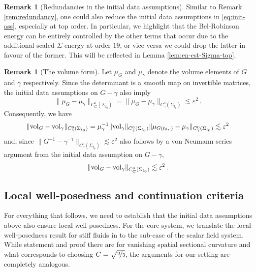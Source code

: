 \documentclass[11pt,leqno,textwidth=10cm]{amsart}
\numberwithin{equation}{section}
\theoremstyle{definition}
\newtheorem{remark}[definition]{Remark}
\theoremstyle{plain}
\newcommand{\1}{\mathbbm{1}}
\newcommand{\vol}[1]{{\text{\normalfont{vol}}}_{#1}}
\renewcommand{\epsilon}{\varepsilon}
\newcommand{\change}[1]{\color{black}#1\color{black}}
\begin{document}
\begin{remark}[Redundancies in the initial data assumptions]
Similar to Remark \ref{rem:redundancy}, one could also reduce the \change{initial data }assumptions in \eqref{eq:init-ass}\change{, especially at top order}. In particular, we highlight that the Bel-Robinson energy can be entirely controlled by the other terms that occur due to the additional scaled $\Sigma$-energy at order \change{$19$}, or vice versa we could drop the latter in favour of the former. This will be reflected in Lemma \ref{lem:en-est-Sigma-top}.
\end{remark}

\begin{remark}[The volume form]\label{eq:rem-vol-form}
Let $\mu_G$ and $\mu_\gamma$ denote the volume elements of $G$ and $\gamma$ respectively. Since the determinant is a smooth map on invertible matrices, the initial data assumptions on $G-\gamma$ also imply
\begin{equation}\label{eq:init-vol-el}
\|\mu_{G}-\mu_{\gamma}\|_{C^0_G(\Sigma_{t_0})}=\|\mu_{G}-\mu_{\gamma}\|_{C^0_\gamma(\Sigma_{t_0})}\lesssim \epsilon^2\,.
\end{equation}
Consequently, we have
\[\|\vol{G}-\vol{\gamma}\|_{C^0_\gamma(\Sigma_{t_0})}=\mu_{\gamma}^{-1}\|\vol{\gamma}\|_{C^0_\gamma(\Sigma_{t_0})}\|\mu_{G(t_0,\cdot)}-\mu_{\gamma}\|_{C^0_\gamma(\Sigma_{t_0})}\lesssim\epsilon^2\]
and, since $\|G^{-1}-\gamma^{-1}\|_{C^0_\gamma(\Sigma_{t_0})}\lesssim\epsilon^2$ also follows by a von Neumann series argument from the initial data assumption on $G-\gamma$,
\begin{equation}\label{eq:init-vol-form}
\|\vol{G}-\vol{\gamma}\|_{C^0_G(\Sigma_{t_0})}\lesssim \epsilon^2\,.
\end{equation}
\end{remark}


\subsection{Local well-posedness and continuation criteria}\label{subsec:lwp}

For everything that follows, we need to establish that the initial data assumptions above also ensure local well-posedness. For the core system, we translate the local well-posedness result for stiff fluids in \cite{Rodnianski2014} to the sub-case of the scalar field system. While statement and proof there are for vanishing spatial sectional curvature and what corresponds to choosing $C=\sqrt{\nicefrac23}$, the arguments for our setting are completely analogous.
\end{document}
